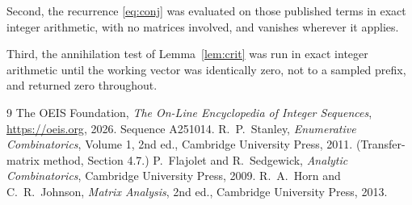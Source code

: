 \documentclass[11pt,a4paper]{article}
\theoremstyle{plain}
\theoremstyle{definition}
\begin{document}
Second, the recurrence \eqref{eq:conj} was evaluated on those published terms in exact
integer arithmetic, with no matrices involved, and vanishes wherever it applies.

Third, the annihilation test of Lemma~\ref{lem:crit} was run in exact integer arithmetic
until the working vector was identically zero, not to a sampled prefix, and returned zero
throughout.

\begin{thebibliography}{9}
 The OEIS Foundation, \emph{The On-Line Encyclopedia of Integer
Sequences}, \url{https://oeis.org}, 2026. Sequence A251014.
 R.~P.~Stanley, \emph{Enumerative Combinatorics}, Volume 1, 2nd ed.,
Cambridge University Press, 2011. (Transfer-matrix method, Section 4.7.)
 P.~Flajolet and R.~Sedgewick, \emph{Analytic Combinatorics}, Cambridge
University Press, 2009.
 R.~A.~Horn and C.~R.~Johnson, \emph{Matrix Analysis}, 2nd ed., Cambridge
University Press, 2013.
\end{thebibliography}
\end{document}
